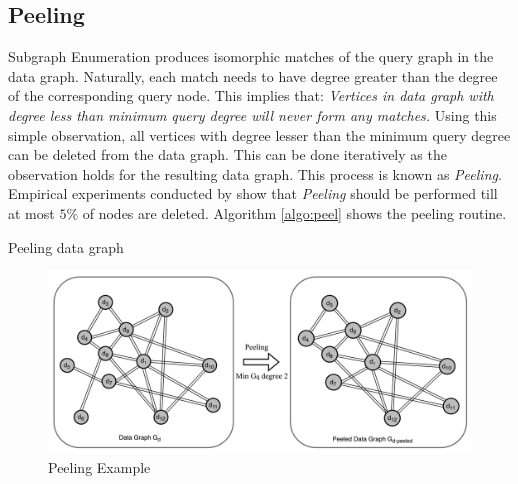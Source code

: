 \subsection{Peeling}\label{peeling}
Subgraph Enumeration produces isomorphic matches of the query graph in the data graph.
Naturally, each match needs to have degree greater than the degree of the corresponding query node.
This implies that: \textit{Vertices in data graph with degree less than minimum query degree will never form any matches.}
Using this simple observation, all vertices with degree lesser than the minimum query degree can be deleted from the data graph.
This can be done iteratively as the observation holds for the resulting data graph.
This process is known as \textit{Peeling}.
Empirical experiments conducted by \cite{PARSEC_VD} show that \textit{Peeling} should be performed till at most $5\%$ of nodes are deleted.
Algorithm \ref{algo:peel} shows the peeling routine.
\begin{algorithm}[h]
    \caption{Peeling data graph}
    \label{algo:peel}


\end{algorithm}
\begin{figure}
    \includegraphics[width=\textwidth]{fig/LR/peeling.png}
    \caption{Peeling Example}
    \label{fig:peeling}
\end{figure}


